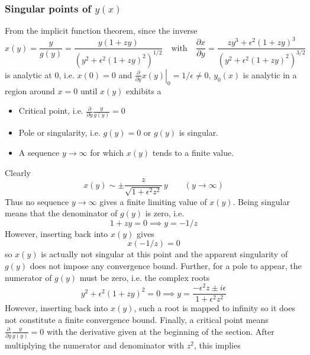 \documentclass[a4paper]{amsart}
\begin{document}
\subsubsection{Singular points of $y(x)$}
From the implicit function theorem, since the inverse
\begin{equation*}
x(y)=\frac{y}{g(y)}=\frac{y(1+zy)}{(y^2+\epsilon^2(1+zy)^2)^{1/2}}\quad\text{with}\quad 
\frac{\partial x}{\partial y}
=
\frac{zy^3+\epsilon^2(1+zy)^3}
{\left(y^2+\epsilon^2(1+zy)^2\right)^{3/2}}
\end{equation*}
is analytic at 0, i.e. $x(0)=0$ and $\left.\frac{\partial}{\partial y}x(y)\right|_0=1/\epsilon\neq 0$, $y_0(x)$ is analytic in a region around $x=0$ until $x(y)$ exhibits a
\begin{itemize}
\item Critical point, i.e. $\frac{\partial}{\partial y}\frac{y}{g(y)}=0$
\item Pole or singularity, i.e. $g(y)=0$ or $g(y)$ is singular.
\item A sequence $y\to\infty$ for which $x(y)$ tends to a finite value.
\end{itemize}
Clearly
\begin{equation*}
x(y)\sim
\pm\frac{z}{\sqrt{1+\epsilon^2z^2}}\,y
\qquad(y\to\infty)
\end{equation*}
Thus no sequence $y\to\infty$ gives a finite limiting value of $x(y)$.
Being singular means that the denominator of $g(y)$ is zero, i.e.
\begin{equation*}
1+zy = 0 \implies y = -1/z
\end{equation*}
However, inserting back into $x(y)$ gives
\begin{equation}\label{eq:one_over_z_is_zero}
x(-1/z) = 0
\end{equation}
so $x(y)$ is actually not singular at this point and the apparent singularity of $g(y)$ does not impose any convergence bound. Further, for a pole to appear, the numerator of $g(y)$ must be zero, i.e. the complex roots
\begin{equation}\label{eq:values_at_infinity}
y^2+\epsilon^2(1+zy)^2=0 \implies y=\frac{-\epsilon^2z\pm i \epsilon}{1+\epsilon^2z^2}
\end{equation}
However, inserting back into $x(y)$, such a root is mapped to infinity so it does not constitute a finite convergence bound.
%
Finally, a critical point means $\frac{\partial}{\partial y}\frac{y}{g(y)}=0$ with the derivative given at the beginning of the section. After multiplying the numerator and denominator with $z^2$, this implies
\end{document}
